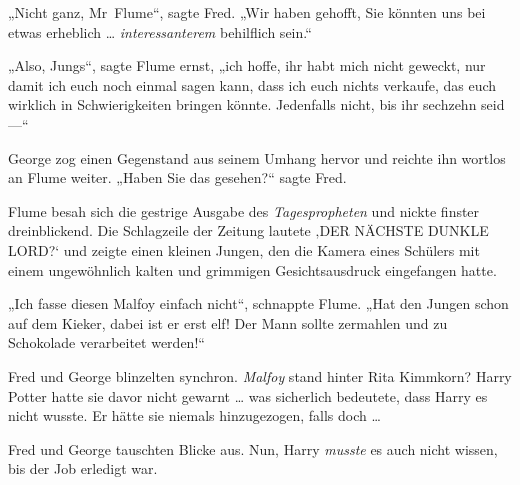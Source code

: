 „Nicht ganz, Mr~Flume“, sagte Fred.
„Wir haben gehofft, Sie könnten uns bei etwas erheblich … \emph{interessanterem} behilflich sein.“

„Also, Jungs“, sagte Flume ernst, „ich hoffe, ihr habt mich nicht geweckt, nur damit ich euch noch einmal sagen kann, dass ich euch nichts verkaufe, das euch wirklich in Schwierigkeiten bringen könnte. Jedenfalls nicht, bis ihr sechzehn seid —“

George zog einen Gegenstand aus seinem Umhang hervor und reichte ihn wortlos an Flume weiter.
„Haben Sie das gesehen?“ sagte Fred.

Flume besah sich die gestrige Ausgabe des \emph{Tagespropheten} und nickte finster dreinblickend. Die Schlagzeile der Zeitung lautete ‚DER NÄCHSTE DUNKLE LORD?‘ und zeigte einen kleinen Jungen, den die Kamera eines Schülers mit einem ungewöhnlich kalten und grimmigen Gesichtsausdruck eingefangen hatte.

„Ich fasse diesen Malfoy einfach nicht“, schnappte Flume.
„Hat den Jungen schon auf dem Kieker, dabei ist er erst elf! Der Mann sollte zermahlen und zu Schokolade verarbeitet werden!“

Fred und George blinzelten synchron. \emph{Malfoy} stand hinter Rita Kimmkorn? Harry Potter hatte sie davor nicht gewarnt … was sicherlich bedeutete, dass Harry es nicht wusste. Er hätte sie niemals hinzugezogen, falls doch …

Fred und George tauschten Blicke aus. Nun, Harry \emph{musste} es auch nicht wissen, bis der Job erledigt war.

